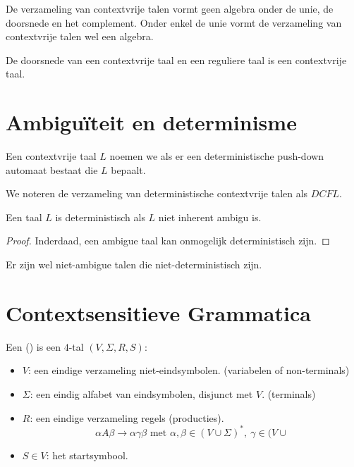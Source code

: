 \documentclass[main.tex]{subfiles}
\begin{document}
\begin{gev}
  De verzameling van contextvrije talen vormt geen algebra onder de unie, de doorsnede en het complement.
  Onder enkel de unie vormt de verzameling van contextvrije talen wel een algebra.
\end{gev}

\begin{st}
  De doorsnede van een contextvrije taal en een reguliere taal is een contextvrije taal.
\end{st}

\section{Ambigu\"iteit en determinisme}

\begin{de}
  Een contextvrije taal $L$ noemen we  als er een deterministische push-down automaat bestaat die $L$ bepaalt.
\end{de}

\begin{de}
  We noteren de verzameling van deterministische contextvrije talen als $DCFL$.
\end{de}

\begin{st}
  Een taal $L$ is deterministisch als $L$ niet inherent ambigu is.
  \begin{proof}
    Inderdaad, een ambigue taal kan onmogelijk deterministisch zijn.
  \end{proof}
\end{st}

\begin{opm}
  Er zijn wel niet-ambigue talen die niet-deterministisch zijn.
\end{opm}


\section{Contextsensitieve Grammatica}

\begin{de}
  Een  () is een $4$-tal $(V,\Sigma,R,S)$:
  \begin{itemize}
  \item $V$: een eindige verzameling niet-eindsymbolen. (variabelen of non-terminals)
  \item $\Sigma$: een eindig alfabet van eindsymbolen, disjunct met $V$. (terminals)
  \item $R$: een eindige verzameling regels (producties).\\
    \[ \alpha A \beta \rightarrow \alpha \gamma \beta \text{ met } \alpha, \beta \in (V \cup \Sigma)^{*},\ \gamma \in (V \cup \]
  \item $S\in V$: het startsymbool.
  \end{itemize}
\end{de}
\end{document}
